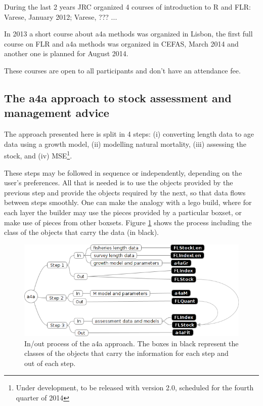 \documentclass[a4paper,english,10pt]{article}\usepackage[]{graphicx}\usepackage[]{color}
\begin{document}
During the last 2 years JRC organized 4 courses of introduction to R and FLR: Varese, January 2012; Varese, ??? ...

In 2013 a short course about a4a methods was organized in Lisbon, the first full course on FLR and a4a methods was organized in CEFAS, March 2014 and another one is planned for August 2014.

These courses are open to all participants and don't have an attendance fee.

\subsection{The a4a approach to stock assessment and management advice}

The approach presented here is split in 4 steps: (i) converting length data to age data using a growth model, (ii) modelling natural mortality, (iii) assessing the stock, and (iv) MSE\footnote{Under development, to be released with version 2.0, scheduled for the fourth quarter of 2014}.

These steps may be followed in sequence or independently, depending on the user's preferences. All that is needed is to use the objects provided by the previous step and provide the objects required by the next, so that data flows between steps smoothly. One can make the analogy with a lego build, where for each layer the builder may use the pieces provided by a particular boxset, or make use of pieces from other boxsets. Figure \ref{fig:inout} shows the process including the class of the objects that carry the data (in black).

\begin{figure}[h]
\centering
\includegraphics[width=\textwidth]{./inout}
\caption{In/out process of the a4a approach. The boxes in black represent the classes of the objects that carry the information for each step and out of each step.}
\label{fig:inout}
\end{figure}
\end{document}
